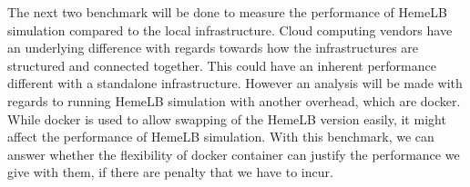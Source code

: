 The next two benchmark will be done to measure the performance of HemeLB simulation compared to the local infrastructure. Cloud computing vendors have an underlying difference with regards towards how the infrastructures are structured and connected together. This could have an inherent performance different with a standalone infrastructure. However an analysis will be made with regards to running HemeLB simulation with another overhead, which are docker. While docker is used to allow swapping of the HemeLB version easily, it might affect the performance of HemeLB simulation. With this benchmark, we can answer whether the flexibility of docker container can justify the performance we give with them, if there are penalty that we have to incur.



